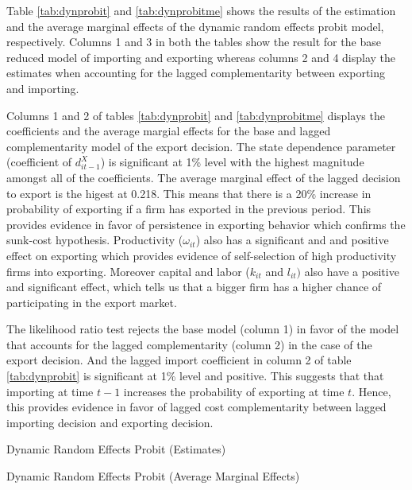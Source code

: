 \documentclass[12pt]{article}
\begin{document}
Table \ref{tab:dynprobit} and \ref{tab:dynprobitme} shows the results of the 
estimation and the average marginal effects of the dynamic random
effects probit model, respectively. Columns 1 and 3 in both the tables show the result for the base
reduced model of importing and exporting  whereas columns 2 and 4
display the estimates when accounting for the lagged complementarity
between exporting and importing. 

  Columns 1 and 2 of tables \ref{tab:dynprobit} and
  \ref{tab:dynprobitme} displays the coefficients and the average
  margial effects for the base and lagged complementarity model of the
  export decision. The state dependence parameter (coefficient of $d_{it-1}^{X}$) is 
  significant at 1\% level with the highest magnitude amongst all of
  the coefficients. The average marginal effect of the lagged
  decision to export is the higest at 0.218. This  means that there is a 20\% increase
  in probability of exporting if a firm has exported in the previous
  period. This provides evidence in favor of  persistence in
  exporting behavior which confirms the sunk-cost hypothesis.   Productivity ($\omega_{it}$) also has a significant and
  and positive effect on exporting which provides evidence of
  self-selection of high productivity firms into exporting. Moreover
  capital and labor ($k_{it}$ and $l_{it})$
  also have a positive and significant effect, which tells us that a
  bigger firm has a higher chance of participating in the export
  market. 


The likelihood ratio test  rejects the base model (column 1) in favor of the
model that accounts for the lagged complementarity (column 2) in the case of 
the export decision. And the lagged import coefficient in column 2 of table \ref{tab:dynprobit} is
  significant  at 1\% level and positive. This suggests that   that importing
  at time $t-1$ increases the probability of exporting at time $t$.
  Hence, this provides evidence  in favor of  lagged cost complementarity
  between lagged importing decision  and exporting decision. 



\begin{center}
\begin{table}[H]
\caption{Dynamic Random Effects Probit (Estimates)}
\label{tab:dynprobit}

\end{table}
\end{center}
\restoregeometry
\begin{center}
\begin{table}[H]
\caption{Dynamic Random Effects Probit (Average Marginal Effects)}
\label{tab:dynprobitme}

\end{table}
\end{center}
\end{document}
